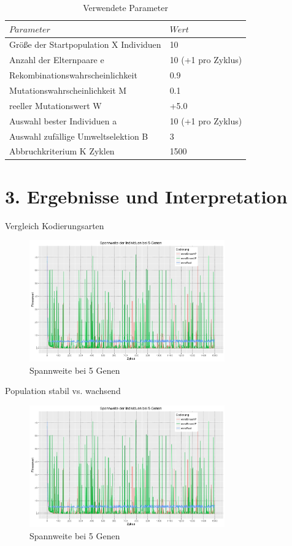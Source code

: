 \documentclass[12pt,
    a4paper,
    headinclude,
    footinclude]{scrreprt}
\begin{document}
\begin{table}[h]
	\centering
	\caption*{Verwendete Parameter}
	\begin{tabularx}{14cm}{|p{9cm}|X|}
		\hline
		$Parameter$ & $Wert$ \\
		\hline
		\hline
		Größe der Startpopulation X Individuen& 10  \\
				\hline
		Anzahl der Elternpaare e & 10 (+1 pro Zyklus)  \\
				\hline
		Rekombinationswahrscheinlichkeit& 0.9 \\
				\hline
		Mutationswahrscheinlichkeit M & 0.1 \\
				\hline
		reeller Mutationswert W& +5.0  \\
				\hline
		Auswahl bester Individuen a& 10 (+1 pro Zyklus) \\
		\hline
		Auswahl zufällige Umweltselektion B& 3 \\
		\hline
		Abbruchkriterium K Zyklen & 1500\\
		\hline
	\end{tabularx}
\end{table}


	
\section*{3. Ergebnisse und Interpretation}	

Vergleich Kodierungsarten
		\begin{figure}[H]
			\includegraphics[width=0.75\textwidth]{spannweite-5-gene.jpeg} 
			
			\caption*{Spannweite bei 5 Genen} 
			\label{InputOutput}
		\end{figure}

Population stabil vs. wachsend
	\begin{figure}[H]
	\includegraphics[width=0.75\textwidth]{spannweite-5-gene.jpeg} 
	
	\caption*{Spannweite bei 5 Genen} 
	\label{InputOutput}
\end{figure}
\end{document}
